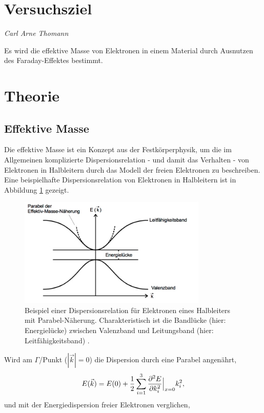 \section{Versuchsziel}
{\footnotesize \textit{Carl Arne Thomann}}

Es wird die effektive Masse von Elektronen in einem Material durch Ausnutzen des Faraday-Effektes bestimmt.
\section{Theorie}
\label{sec:Theorie}
\subsection{Effektive Masse}
Die effektive Masse ist ein Konzept aus der Festkörperphysik,
um die im Allgemeinen komplizierte Dispersionsrelation - und damit das Verhalten - von Elektronen in Halbleitern
durch das Modell der freien Elektronen zu beschreiben.
Eine beispielhafte Dispersionsrelation von Elektronen in Halbleitern ist in
Abbildung \ref{fig:dispersion} gezeigt.
\begin{figure}
    \centering
    \includegraphics[width=0.8\textwidth]{graphics/dispersion.png}
    \caption{Beispiel einer Dispersionsrelation für Elektronen eines Halbleiters mit Parabel-Näherung. Charakteristisch ist die Bandlücke (hier: Energielücke) zwischen Valenzband und Leitungsband (hier: Leitfähigkeitsband) \cite{skript}.}
    \label{fig:dispersion}
\end{figure}
Wird am $\Gamma$\-/Punkt ($|\vec k| = 0$) die Dispersion durch eine Parabel angenährt,
\begin{equation}
    E(\vec k) = E(0) + \frac{1}{2}\sum\limits_{i=1}^3 \frac{\partial^2 E}{\partial k_i^2}\Bigl|_{x=0}k_i^2,
\end{equation}
und mit der Energiedispersion freier Elektronen verglichen, %
